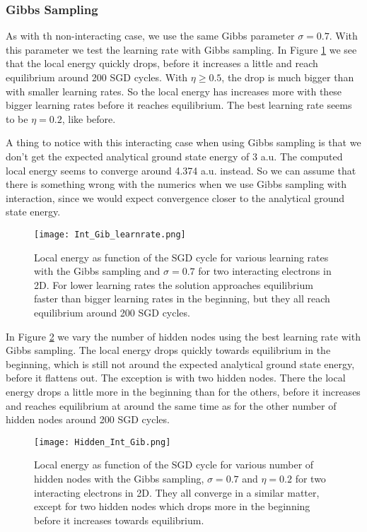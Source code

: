 \documentclass[12pt,a4paper,english]{article}
\begin{document}
\newpage
\subsubsection{Gibbs Sampling}
\label{subsubsect:Results_int_Gibbs}
As with th non-interacting case, we use the same Gibbs parameter $\sigma=0.7$. With this parameter we test the learning rate with Gibbs sampling. In Figure \ref{fig:check_learnrate_Int_Gib} we see that the local energy quickly drops, before it increases a little and reach equilibrium around 200 SGD cycles. With $\eta\geq0.5$, the drop is much bigger than with smaller learning rates. So the local energy has increases more with these bigger learning rates before it reaches equilibrium. The best learning rate seems to be $\eta=0.2$, like before.

A thing to notice with this interacting case when using Gibbs sampling is that we don't get the expected analytical ground state energy of 3 a.u. The computed local energy seems to converge around 4.374 a.u. instead. So we can assume that there is something wrong with the numerics when we use Gibbs sampling with interaction, since we would expect convergence closer to the analytical ground state energy. 

\begin{figure}[t!]
	\centering\texttt{[image: Int\_Gib\_learnrate.png]}
	\caption{Local energy as function of the SGD cycle for various learning rates with the Gibbs sampling and $\sigma=0.7$ for two interacting electrons in 2D. For lower learning rates the solution approaches equilibrium faster than bigger learning rates in the beginning, but they all reach equilibrium around 200 SGD cycles. \label{fig:check_learnrate_Int_Gib}}
\end{figure}

\newpage
In Figure \ref{fig:check_hidden_Int_Gib} we vary the number of hidden nodes using the best learning rate with Gibbs sampling. The local energy drops quickly towards equilibrium in the beginning, which is still not around the expected analytical ground state energy, before it flattens out. The exception is with two hidden nodes. There the local energy drops a little more in the beginning than for the others, before it increases and reaches equilibrium at around the same time as for the other number of hidden nodes around 200 SGD cycles. 

\begin{figure}[t!]
	\centering\texttt{[image: Hidden\_Int\_Gib.png]}
	\caption{Local energy as function of the SGD cycle for various number of hidden nodes with the Gibbs sampling, $\sigma=0.7$ and $\eta=0.2$ for two interacting electrons in 2D. They all converge in a similar matter, except for two hidden nodes which drops more in the beginning before it increases towards equilibrium. \label{fig:check_hidden_Int_Gib}}
\end{figure}
\end{document}
